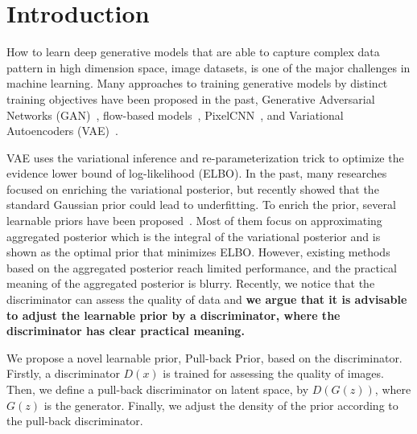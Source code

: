 \section{Introduction}

How to learn deep generative models that are able to capture complex data pattern in high dimension space, \EG image datasets, is one of the major challenges in machine learning. Many approaches to training generative models by distinct training objectives have been proposed in the past, \EG Generative Adversarial Networks (GAN)~\cite{goodfellow2014generative}, flow-based models~\cite{dinh2016density,kingma2018glow}, PixelCNN~\cite{van2016conditional}, and Variational Autoencoders (VAE)~\cite{kingma2014auto,rezende_stochastic_2014}.

VAE uses the variational inference and re-parameterization trick to optimize the evidence lower bound of log-likelihood (ELBO). In the past, many researches~\cite{kingma2016improved,tomczak2016improving} focused on enriching the variational posterior, but recently \cite{tomczak2018vae} showed that the standard Gaussian prior could lead to underfitting. To enrich the prior, several learnable priors have been proposed~\cite{tomczak2018vae,bauer2019resampled,takahashi2019variational}. Most of them focus on approximating aggregated posterior which is the integral of the variational posterior and is shown as the optimal prior that minimizes ELBO. However, existing methods based on the aggregated posterior reach limited performance, and the practical meaning of the aggregated posterior is blurry. Recently, we notice that the discriminator can assess the quality of data and \textbf{we argue that it is advisable to adjust the learnable prior by a discriminator, where the discriminator has clear practical meaning. } 

We propose a novel learnable prior, Pull-back Prior, based on the discriminator.
Firstly, a discriminator $D(x)$ is trained for assessing the quality of images. Then, we define a pull-back discriminator on latent space, by $D(G(z))$, where $G(z)$ is the generator. Finally, we adjust the density of the prior according to the pull-back discriminator. 

